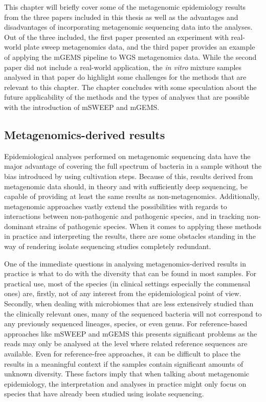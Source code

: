 \documentclass[officiallayout]{tktla}
\begin{document}
This chapter will briefly cover some of the metagenomic epidemiology
results from the three papers included in this thesis as well as the
advantages and disadvantages of incorporating metagenomic sequencing
data into the analyses. Out of the three included, the first paper
presented an experiment with real-world plate sweep metagenomics data,
and the third paper provides an example of applying the mGEMS pipeline
to WGS metagenomics data. While the second paper did not include a
real-world application, the \textit{in vitro} mixture samples analysed
in that paper do highlight some challenges for the methods that are
relevant to this chapter. The chapter concludes with some speculation
about the future applicability of the methods and the types of
analyses that are possible with the introduction of mSWEEP and mGEMS.

\subsection{Metagenomics-derived results}

Epidemiological analyses performed on metagenomic sequencing data have
the major advantage of covering the full spectrum of bacteria in a
sample without the bias introduced by using cultivation steps. Because
of this, results derived from metagenomic data should, in theory and
with sufficiently deep sequencing, be capable of providing at least
the same results as non-metagenomics. Additionally, metagenomic
approaches vastly extend the possibilities with regards to
interactions between non-pathogenic and pathogenic species, and in
tracking non-dominant strains of pathogenic species. When it comes to
applying these methods in practice and interpreting the results, there
are some obstacles standing in the way of rendering isolate sequencing
studies completely redundant.

One of the immediate questions in analysing metagenomics-derived
results in practice is what to do with the diversity that can be found
in most samples. For practical use, most of the species (in clinical
settings especially the commensal ones) are, firstly, not of any
interest from the epidemiological point of view. Secondly, when
dealing with microbiomes that are less extensively studied than the
clinically relevant ones, many of the sequenced bacteria will not
correspond to any previously sequenced lineages, species, or even
genus. For reference-based approaches like mSWEEP and mGEMS this
presents significant problems as the reads may only be analysed at the
level where related reference sequences are available. Even for
reference-free approaches, it can be difficult to place the results in
a meaningful context if the samples contain significant amounts of
unknown diversity. These factors imply that when talking about
metagenomic epidemiology, the interpretation and analyses in practice
might only focus on species that have already been studied using
isolate sequencing.
\end{document}
